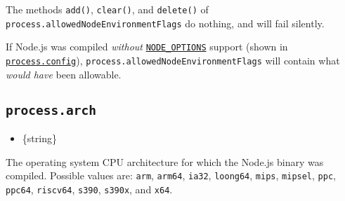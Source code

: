 \begin{Shaded}
\begin{Highlighting}[]
\OperatorTok{=} \NormalTok{(}\NormalTok{)}\OperatorTok{;}

\KeywordTok{=\textgreater{}}\NormalTok{ \{}
\NormalTok{\})}\OperatorTok{;}
\end{Highlighting}
\end{Shaded}

The methods \texttt{add()}, \texttt{clear()}, and \texttt{delete()} of
\texttt{process.allowedNodeEnvironmentFlags} do nothing, and will fail
silently.

If Node.js was compiled \emph{without}
\href{cli.md\#node_optionsoptions}{\texttt{NODE\_OPTIONS}} support
(shown in \hyperref[processconfig]{\texttt{process.config}}),
\texttt{process.allowedNodeEnvironmentFlags} will contain what
\emph{would have} been allowable.

\subsection{\texorpdfstring{\texttt{process.arch}}{process.arch}}\label{process.arch}

\begin{itemize}
\tightlist
\item
  \{string\}
\end{itemize}

The operating system CPU architecture for which the Node.js binary was
compiled. Possible values are:
\texttt{\textquotesingle{}arm\textquotesingle{}},
\texttt{\textquotesingle{}arm64\textquotesingle{}},
\texttt{\textquotesingle{}ia32\textquotesingle{}},
\texttt{\textquotesingle{}loong64\textquotesingle{}},
\texttt{\textquotesingle{}mips\textquotesingle{}},
\texttt{\textquotesingle{}mipsel\textquotesingle{}},
\texttt{\textquotesingle{}ppc\textquotesingle{}},
\texttt{\textquotesingle{}ppc64\textquotesingle{}},
\texttt{\textquotesingle{}riscv64\textquotesingle{}},
\texttt{\textquotesingle{}s390\textquotesingle{}},
\texttt{\textquotesingle{}s390x\textquotesingle{}}, and
\texttt{\textquotesingle{}x64\textquotesingle{}}.

